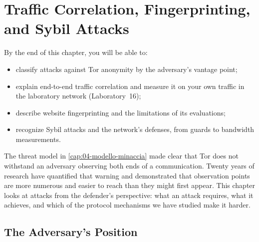 \chapter{Traffic Correlation, Fingerprinting, and Sybil Attacks}\label{cap:26-attacchi}

\begin{obiettivi}
By the end of this chapter, you will be able to:
\begin{itemize}[nosep]
  \item classify attacks against Tor anonymity by the adversary's vantage point;
  \item explain end-to-end traffic correlation and measure it on your own traffic in the laboratory network (Laboratory~16);
  \item describe website fingerprinting and the limitations of its evaluations;
  \item recognize Sybil attacks and the network's defenses, from guards to bandwidth measurements.
\end{itemize}
\end{obiettivi}

The threat model in \cref{cap:04-modello-minaccia} made clear that Tor does not withstand an adversary observing both ends of a communication. Twenty years of research have quantified that warning and demonstrated that observation points are more numerous and easier to reach than they might first appear. This chapter looks at attacks from the defender's perspective: what an attack requires, what it achieves, and which of the protocol mechanisms we have studied make it harder.

\section{The Adversary's Position}\label{sec:att-posizioni}

